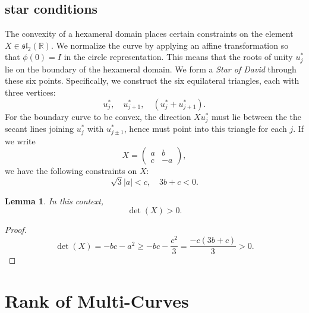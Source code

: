 \documentclass[11pt]{amsart}
\newtheorem{lemma}{Lemma}
\newcommand{\ring}[1]{\mathbb{#1}}
\begin{document}
\subsection{star conditions}\label{sec:star}

The convexity of a hexameral domain places certain constraints on the
element $X\in\mathfrak{sl}_2(\ring{R})$.  We normalize the curve by applying
an affine transformation so that $\phi(0)=I$ in the circle representation.
This means that the roots of unity $u^*_j$ lie on the boundary of 
the hexameral domain.  We form a {\it Star of David} through these six points.
Specifically, we construct the six equilateral triangles, each with three
vertices:
   $$
   u^*_j,\quad u^*_{j+1},\quad (u^*_j + u^*_{j+1}).
$$
For the boundary curve to be convex, the direction $X u^*_j$ must lie between
the the secant lines joining $u^*_j$ with $u^*_{j\pm 1}$, hence
must point into this triangle for each $j$.  If we write
$$X  = \left(\begin{matrix} a & b \\ c & -a \end{matrix}\right),$$
we have the following constraints on $X$:
$$
\sqrt{3} |a| < c,\quad 3 b + c < 0.
$$

\begin{lemma}
In this context,
$$\det(X) > 0.$$
\end{lemma}

\begin{proof} 
$$\det(X) = - b c - a^2 \ge - b c  - \frac{c^2}{3} = \frac{-c(3 b + c)}{3} >0.$$
\end{proof}



\section{Rank of Multi-Curves}


\end{document}
